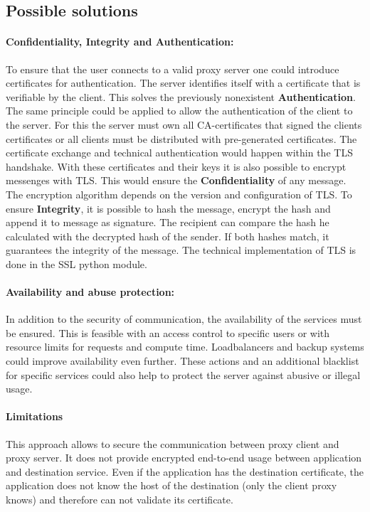 \documentclass[12pt, a4paper]{scrartcl}
\begin{document}
\subsection{Possible solutions}
\paragraph{Confidentiality, Integrity and Authentication:}
To ensure that the user connects to a valid proxy server one could introduce certificates for authentication. The server identifies itself with a certificate that is verifiable by the client. This solves the previously nonexistent \textbf{Authentication}. The same principle could be applied to allow the authentication of the client to the server. For this the server must own all CA-certificates that signed the clients certificates or all clients must be distributed with pre-generated certificates.\newline
The certificate exchange and technical authentication would happen within the \ac{TLS} handshake. With these certificates and their keys it is also possible to encrypt messenges with \ac{TLS}. This would ensure the \textbf{Confidentiality} of any message. The encryption algorithm depends on the version and configuration of \ac{TLS}.\newline
To ensure \textbf{Integrity}, it is possible to hash the message, encrypt the hash and append it to message as signature. The recipient can compare the hash he calculated with the decrypted hash of the sender. If both hashes match, it guarantees the integrity of the message.\newline
The technical implementation of \ac{TLS} is done in the \ac{SSL} python module.
\paragraph{Availability and abuse protection:}
In addition to the security of communication, the availability of the services must be ensured. This is feasible with an access control to specific users or with resource limits for requests and compute time. Loadbalancers and backup systems could improve availability even further.\newline
These actions and an additional blacklist for specific services could also help to protect the server against abusive or illegal usage.
\paragraph{Limitations}
This approach allows to secure the communication between proxy client and proxy server. It does not provide encrypted end-to-end usage between application and destination service. Even if the application has the destination certificate, the application does not know the host of the destination (only the client proxy knows) and therefore can not validate its certificate.
\end{document}
